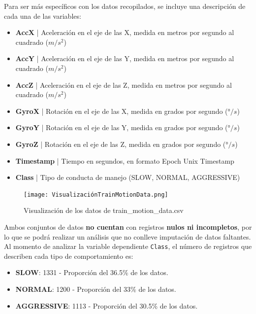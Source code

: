 \documentclass[runningheads]{llncs}
\begin{document}
\textsc Para ser más específicos con los datos recopilados, se incluye una descripción de cada una de las variables:
\begin{itemize}
    \item \textbf{AccX} | Aceleración en el eje de las X, medida en metros por segundo al cuadrado ($m/s^2$)\\
    \item \textbf{AccY} | Aceleración en el eje de las Y, medida en metros por segundo al cuadrado ($m/s^2$)\\
    \item \textbf{AccZ }| Aceleración en el eje de las Z, medida en metros por segundo al cuadrado ($m/s^2$)\\
    \item \textbf{GyroX} | Rotación en el eje de las X, medida en grados por segundo (°$/s$)\\
    \item \textbf{GyroY} | Rotación en el eje de las Y, medida en grados por segundo (°$/s$)\\
    \item \textbf{GyroZ} | Rotación en el eje de las Z, medida en grados por segundo (°$/s$)\\
    \item \textbf{Timestamp} | Tiempo en segundos, en formato Epoch Unix Timestamp\\
    \item \textbf{Class} | Tipo de conducta de manejo (SLOW, NORMAL, AGGRESSIVE)
\end{itemize} 

    \begin{figure}
        \centering
        \texttt{[image: VisualizaciónTrainMotionData.png]}
        \caption{Visualización de los datos de train\_motion\_data.csv}
        \label{fig:comand}%
    \end{figure}

\textsc Ambos conjuntos de datos \textbf{no cuentan} con registros \textbf{nulos ni incompletos}, por lo que se podrá realizar un análisis que no conlleve imputación de datos faltantes. Al momento de analizar la variable dependiente \verb|Class|, el número de registros que describen cada tipo de comportamiento es:

\begin{itemize}
    \item \textbf{SLOW}: 1331 - Proporción del 36.5\% de los datos.\\
    \item \textbf{NORMAL}: 1200 - Proporción del 33\% de los datos.\\
    \item \textbf{AGGRESSIVE}: 1113 - Proporción del 30.5\% de los datos.
\end{itemize}
\end{document}
